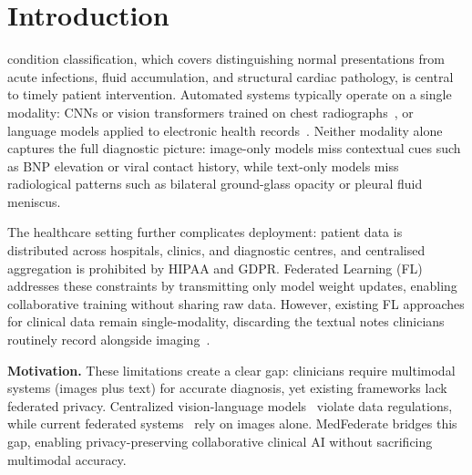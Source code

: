 \documentclass[conference]{IEEEtran}
\begin{document}
\section{Introduction}

 condition classification, which covers
distinguishing normal presentations from acute infections, fluid
accumulation, and structural cardiac pathology, is central to timely
patient intervention.
Automated systems typically operate on a single modality: CNNs or vision
transformers trained on chest radiographs~\cite{Rajpurkar2017,Irvin2019},
or language models applied to electronic health records~\cite{Devlin2019}.
Neither modality alone captures the full diagnostic picture: image-only
models miss contextual cues such as BNP elevation or viral contact
history, while text-only models miss radiological patterns such as
bilateral ground-glass opacity or pleural fluid meniscus.

The healthcare setting further complicates deployment: patient data is
distributed across hospitals, clinics, and diagnostic centres, and
centralised aggregation is prohibited by HIPAA and GDPR. Federated
Learning (FL)~\cite{McMahan2017} addresses these constraints by
transmitting only model weight updates, enabling collaborative training
without sharing raw data. However, existing FL approaches for clinical
data remain single-modality, discarding the textual notes clinicians
routinely record alongside imaging~\cite{Sheller2020,Rieke2020,Kaissis2021}.

\textbf{Motivation.}
These limitations create a clear gap: clinicians require multimodal systems
(images plus text) for accurate diagnosis, yet existing frameworks lack
federated privacy. Centralized vision-language models~\cite{Zhang2023biomed,Li2023llavamed}
violate data regulations, while current federated systems~\cite{Sheller2020,Kaissis2021}
rely on images alone. MedFederate bridges this gap, enabling privacy-preserving
collaborative clinical AI without sacrificing multimodal accuracy.
\end{document}
